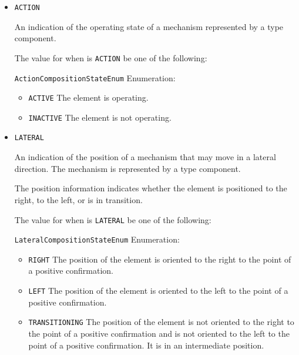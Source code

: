 \begin{itemize}

\item \texttt{ACTION}


An indication of the operating state of a mechanism represented by a  type component.


The value for  when  is \texttt{ACTION} \MUST be one of the following: 


\texttt{ActionCompositionStateEnum} Enumeration:

\begin{itemize}
\item \texttt{ACTIVE} \newline The  element is operating. 
\item \texttt{INACTIVE} \newline The  element is not operating. 
\end{itemize}

\item \texttt{LATERAL}


An indication of the position of a mechanism that may move in a lateral direction.   The mechanism is represented by a  type component. 

The position information indicates whether the  element is positioned to the right, to the left, or is in transition. 


The value for  when  is \texttt{LATERAL} \MUST be one of the following: 


\texttt{LateralCompositionStateEnum} Enumeration:

\begin{itemize}
\item \texttt{RIGHT} \newline The position of the  element is oriented to the right to the point of a positive confirmation. 
\item \texttt{LEFT} \newline The position of the  element is oriented to the left to the point of a positive confirmation. 
\item \texttt{TRANSITIONING} \newline The position of the  element is not oriented to the right to the point of a positive confirmation and is not oriented to the left to the point of a positive confirmation. It is in an intermediate position. 
\end{itemize}


\end{itemize}
